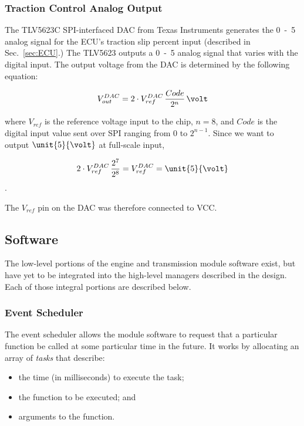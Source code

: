 \subsubsection{Traction Control Analog Output}

The TLV5623C SPI-interfaced DAC from Texas Instruments generates the \unit{0-5}{\volt} analog signal for the ECU's traction slip percent input (described in Sec.\ \ref{sec:ECU}.) The TLV5623 outputs a \unit{0-5}{\volt} analog signal that varies with the digital input. The output voltage from the DAC is determined by the following equation: \cite{TLV5623}

\begin{equation}
V_{out}^{DAC}=2\cdot{V_{ref}^{DAC}}\,\frac{Code}{2^{n}}\,\volt
\end{equation}

where $V_{ref}$ is the reference voltage input to the chip, $n=8$, and $Code$ is the digital input value sent over SPI ranging from $0$ to $2^{n-1}$. Since we want to output $\unit{5}{\volt}$ at full-scale input,

\begin{equation}
2\cdot{V_{ref}^{DAC}}\,\frac{2^{7}}{2^{8}}=V_{ref}^{DAC}=\unit{5}{\volt}
\end{equation}.

The $V_{ref}$ pin on the DAC was therefore connected to VCC.

\subsection{Software}

The low-level portions of the engine and transmission module software exist, but have yet to be integrated into the high-level managers described in the design. Each of those integral portions are described below.

\subsubsection{Event Scheduler}

The event scheduler allows the module software to request that a particular function be called at some particular time in the future. It works by allocating an array of \emph{tasks} that describe:

\begin{itemize}
	\item the time (in milliseconds) to execute the task;
	\item the function to be executed; and
	\item arguments to the function.
\end{itemize}

